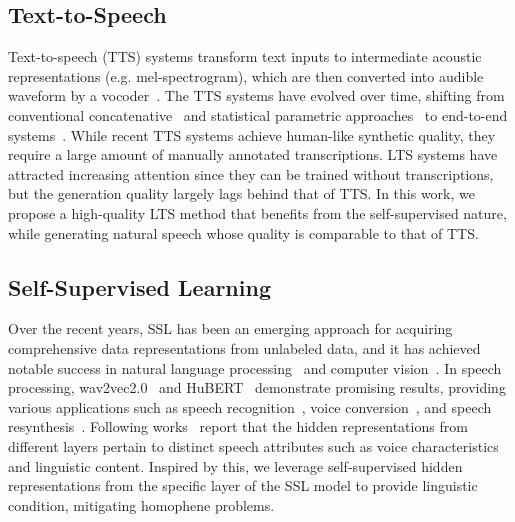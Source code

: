 \documentclass[letterpaper]{article} %
\begin{document}
\subsection{Text-to-Speech}
Text-to-speech (TTS) systems transform text inputs to intermediate acoustic representations (e.g. mel-spectrogram), which are then converted into audible waveform by a vocoder~\cite{prenger2019waveglow,yamamoto2020parallel,kong2020hifi,kim21f_interspeech}. The TTS systems have evolved over time, shifting from conventional concatenative~\cite{hunt1996unit} and statistical parametric approaches~\cite{black2007statistical} to end-to-end systems~\cite{shen2018natural,ren2020fastspeech2,lancucki2021fastpitch,lee2021multi,popov2021grad}.
While recent TTS systems achieve human-like synthetic quality, they require a large amount of manually annotated transcriptions. LTS systems have attracted increasing attention since they can be trained without transcriptions, but the generation quality largely lags behind that of TTS. In this work, we propose a high-quality LTS method that benefits from the self-supervised nature, while generating natural speech whose quality is comparable to that of TTS.

\subsection{Self-Supervised Learning}
Over the recent years, SSL has been an emerging approach for acquiring comprehensive data representations from unlabeled data, and it has achieved notable success in natural language processing~\cite{devlin2018bert} and computer vision~\cite{bachman2019learning, lin2021completer}. In speech processing, wav2vec2.0~\cite{baevski2020wav2vec} and HuBERT~\cite{hsu2021hubert} demonstrate promising results, providing various applications such as speech recognition~\cite{baevski2021unsupervised}, voice conversion~\cite{lee2021voicemixer,choi2021neural}, and speech resynthesis~\cite{polyak2021speech}. Following works~\cite{yang21c_interspeech,chang2022distilhubert} report that the hidden representations from different layers pertain to distinct speech attributes such as voice characteristics and linguistic content. Inspired by this, we leverage self-supervised hidden representations from the specific layer of the SSL model to provide linguistic condition, mitigating homophene problems.
\end{document}
